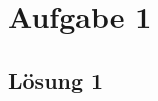 \documentclass[main.tex]{subfiles}
\begin{document}
\section{Aufgabe 1}

\subsection{Lösung 1}
\end{document}
